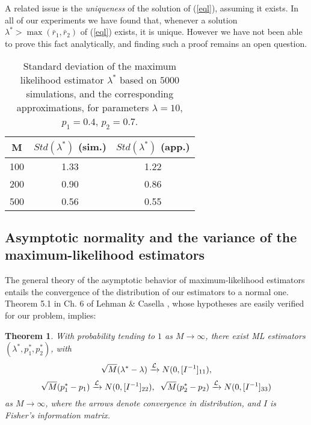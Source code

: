 \documentclass[a4paper,10pt,twoside]{article}
\newtheorem{theorem}{Theorem}
\begin{document}
A related issue is the {\it{uniqueness}} of the solution of (\ref{eql}), assuming it exists. In all of our experiments we have found that, whenever a solution
$\lambda^*>\max(\bar{r}_1,\bar{r}_2)$ of (\ref{eql}) exists, it is unique. However we have not been able to prove this 
fact analytically, and finding such a proof remains an open question.


\begin{table}\label{MLvar}
	\begin{center}
		\begin{tabular}{|c|c|c|}
			\hline {M}  & {$Std(\lambda^*)$ (sim.)} & {$Std(\lambda^*)$ (app.)} \\ 
			\hline	100  & 1.33 & 1.22\\
			\hline	200 & 0.90 & 0.86 \\
			\hline	500  & 0.56 & 0.55\\
			\hline 
		\end{tabular}
	\end{center} 
	\caption{Standard deviation of the maximum likelihood estimator $\lambda^*$ based on $5000$ simulations, and the 
		corresponding approximations, for parameters $\lambda=10$, $p_1=0.4$, $p_2=0.7$.}
\end{table}

\subsection{Asymptotic normality and the variance of the maximum-likelihood estimators}

The general theory of the asymptotic behavior of maximum-likelihood estimators entails the convergence of 
the distribution of our estimators to a normal one. Theorem 5.1 in Ch. 6 of Lehman \& Casella \cite{lehman}, whose hypotheses are
easily verified for our problem, implies:
\begin{theorem}\label{norm}
	With probability tending to $1$ as $M\rightarrow \infty$, there exist
	ML estimators $(\lambda^*,p_1^*,p_2^*)$, with 
	$$\sqrt{M}(\lambda^*-\lambda)\xrightarrow{{\cal{L}}} N(0,[I^{-1}]_{11}),$$
	$$\sqrt{M}(p_1^*-p_1)\xrightarrow{{\cal{L}}} N(0,[I^{-1}]_{22}),\;\;\sqrt{M}(p_2^*-p_2)\xrightarrow{{\cal{L}}} N(0,[I^{-1}]_{33})$$
	as $M\rightarrow \infty$, where the arrows denote convergence in distribution, and $I$ is Fisher's information matrix.
\end{theorem}
\end{document}
